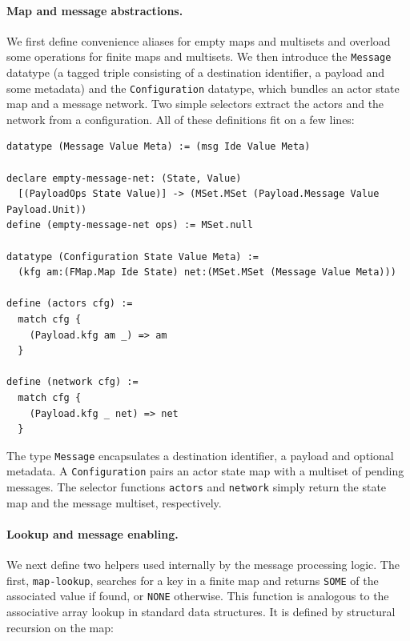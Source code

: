 \paragraph{Map and message abstractions.}  We first define convenience aliases for empty maps and multisets and overload some operations for finite maps and multisets.  We then introduce the \texttt{Message} datatype (a tagged triple consisting of a destination identifier, a payload and some metadata) and the \texttt{Configuration} datatype, which bundles an actor state map and a message network.  Two simple selectors extract the actors and the network from a configuration.  All of these definitions fit on a few lines:

\begin{lstlisting}[language=Athena,style=athena]
datatype (Message Value Meta) := (msg Ide Value Meta)

declare empty-message-net: (State, Value)
  [(PayloadOps State Value)] -> (MSet.MSet (Payload.Message Value Payload.Unit))
define (empty-message-net ops) := MSet.null

datatype (Configuration State Value Meta) :=
  (kfg am:(FMap.Map Ide State) net:(MSet.MSet (Message Value Meta)))

define (actors cfg) :=
  match cfg {
    (Payload.kfg am _) => am
  }

define (network cfg) :=
  match cfg {
    (Payload.kfg _ net) => net
  }
\end{lstlisting}

The type \lstinline{Message} encapsulates a destination identifier, a payload and optional metadata.  A \lstinline{Configuration} pairs an actor state map with a multiset of pending messages.  The selector functions \lstinline{actors} and \lstinline{network} simply return the state map and the message multiset, respectively. 

\paragraph{Lookup and message enabling.}  We next define two helpers used internally by the message processing logic.  The first, \lstinline{map-lookup}, searches for a key in a finite map and returns \lstinline{SOME} of the associated value if found, or \lstinline{NONE} otherwise.  This function is analogous to the associative array lookup in standard data structures.  It is defined by structural recursion on the map:

